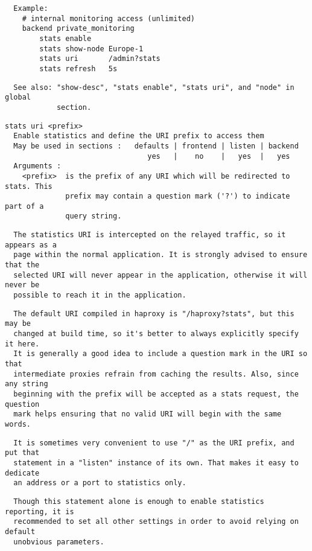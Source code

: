 \begin{verbatim}
  Example:
    # internal monitoring access (unlimited)
    backend private_monitoring
        stats enable
        stats show-node Europe-1
        stats uri       /admin?stats
        stats refresh   5s
\end{verbatim}

\begin{verbatim}
  See also: "show-desc", "stats enable", "stats uri", and "node" in global
            section.
\end{verbatim}

\begin{verbatim}
stats uri <prefix>
  Enable statistics and define the URI prefix to access them
  May be used in sections :   defaults | frontend | listen | backend
                                 yes   |    no    |   yes  |   yes
  Arguments :
    <prefix>  is the prefix of any URI which will be redirected to stats. This
              prefix may contain a question mark ('?') to indicate part of a
              query string.
\end{verbatim}

\begin{verbatim}
  The statistics URI is intercepted on the relayed traffic, so it appears as a
  page within the normal application. It is strongly advised to ensure that the
  selected URI will never appear in the application, otherwise it will never be
  possible to reach it in the application.
\end{verbatim}

\begin{verbatim}
  The default URI compiled in haproxy is "/haproxy?stats", but this may be
  changed at build time, so it's better to always explicitly specify it here.
  It is generally a good idea to include a question mark in the URI so that
  intermediate proxies refrain from caching the results. Also, since any string
  beginning with the prefix will be accepted as a stats request, the question
  mark helps ensuring that no valid URI will begin with the same words.
\end{verbatim}

\begin{verbatim}
  It is sometimes very convenient to use "/" as the URI prefix, and put that
  statement in a "listen" instance of its own. That makes it easy to dedicate
  an address or a port to statistics only.
\end{verbatim}

\begin{verbatim}
  Though this statement alone is enough to enable statistics reporting, it is
  recommended to set all other settings in order to avoid relying on default
  unobvious parameters.
\end{verbatim}

